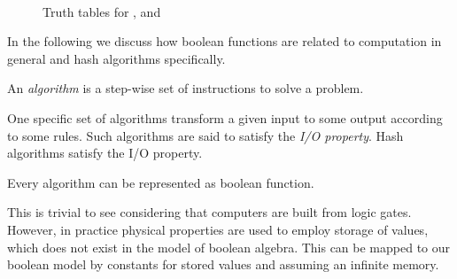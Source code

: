 \begin{figure}[!t]
  \centering
  ~
  ~
  \caption{Truth tables for ,  and }
  \label{tab:andornot-truthtables}
\end{figure}

In the following we discuss how boolean functions are related
to computation in general and hash algorithms specifically.

\begin{defi}
  An \emph{algorithm} is a step-wise set of instructions to solve a problem.
\end{defi}

One specific set of algorithms transform a given input to some output according
to some rules. Such algorithms are said to satisfy the \emph{I/O property}.
Hash algorithms satisfy the I/O property.

\begin{theorem}
  Every algorithm can be represented as boolean function.
\end{theorem}

This is trivial to see considering that computers are built from logic gates.
However, in practice physical properties are used to employ storage of values,
which does not exist in the model of boolean algebra. This can be mapped to
our boolean model by constants for stored values and assuming an infinite memory.

